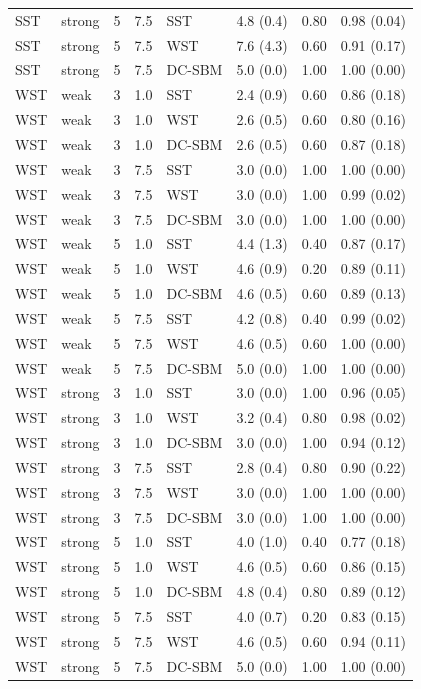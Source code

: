 \begin{table}
\begin{tabular}[t]{llrrllll}
SST & strong & 5 & 7.5 & SST & 4.8 (0.4) & 0.80 & 0.98 (0.04)\\
SST & strong & 5 & 7.5 & WST & 7.6 (4.3) & 0.60 & 0.91 (0.17)\\
SST & strong & 5 & 7.5 & DC-SBM & 5.0 (0.0) & 1.00 & 1.00 (0.00)\\
WST & weak & 3 & 1.0 & SST & 2.4 (0.9) & 0.60 & 0.86 (0.18)\\
\addlinespace
WST & weak & 3 & 1.0 & WST & 2.6 (0.5) & 0.60 & 0.80 (0.16)\\
WST & weak & 3 & 1.0 & DC-SBM & 2.6 (0.5) & 0.60 & 0.87 (0.18)\\
WST & weak & 3 & 7.5 & SST & 3.0 (0.0) & 1.00 & 1.00 (0.00)\\
WST & weak & 3 & 7.5 & WST & 3.0 (0.0) & 1.00 & 0.99 (0.02)\\
WST & weak & 3 & 7.5 & DC-SBM & 3.0 (0.0) & 1.00 & 1.00 (0.00)\\
\addlinespace
WST & weak & 5 & 1.0 & SST & 4.4 (1.3) & 0.40 & 0.87 (0.17)\\
WST & weak & 5 & 1.0 & WST & 4.6 (0.9) & 0.20 & 0.89 (0.11)\\
WST & weak & 5 & 1.0 & DC-SBM & 4.6 (0.5) & 0.60 & 0.89 (0.13)\\
WST & weak & 5 & 7.5 & SST & 4.2 (0.8) & 0.40 & 0.99 (0.02)\\
WST & weak & 5 & 7.5 & WST & 4.6 (0.5) & 0.60 & 1.00 (0.00)\\
\addlinespace
WST & weak & 5 & 7.5 & DC-SBM & 5.0 (0.0) & 1.00 & 1.00 (0.00)\\
WST & strong & 3 & 1.0 & SST & 3.0 (0.0) & 1.00 & 0.96 (0.05)\\
WST & strong & 3 & 1.0 & WST & 3.2 (0.4) & 0.80 & 0.98 (0.02)\\
WST & strong & 3 & 1.0 & DC-SBM & 3.0 (0.0) & 1.00 & 0.94 (0.12)\\
WST & strong & 3 & 7.5 & SST & 2.8 (0.4) & 0.80 & 0.90 (0.22)\\
\addlinespace
WST & strong & 3 & 7.5 & WST & 3.0 (0.0) & 1.00 & 1.00 (0.00)\\
WST & strong & 3 & 7.5 & DC-SBM & 3.0 (0.0) & 1.00 & 1.00 (0.00)\\
WST & strong & 5 & 1.0 & SST & 4.0 (1.0) & 0.40 & 0.77 (0.18)\\
WST & strong & 5 & 1.0 & WST & 4.6 (0.5) & 0.60 & 0.86 (0.15)\\
WST & strong & 5 & 1.0 & DC-SBM & 4.8 (0.4) & 0.80 & 0.89 (0.12)\\
\addlinespace
WST & strong & 5 & 7.5 & SST & 4.0 (0.7) & 0.20 & 0.83 (0.15)\\
WST & strong & 5 & 7.5 & WST & 4.6 (0.5) & 0.60 & 0.94 (0.11)\\
WST & strong & 5 & 7.5 & DC-SBM & 5.0 (0.0) & 1.00 & 1.00 (0.00)\\
\bottomrule
\end{tabular}
\end{table}
